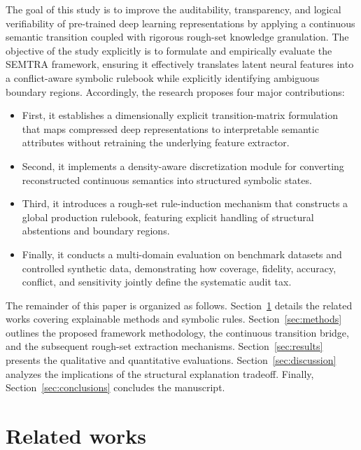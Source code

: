 \documentclass[make,article,submit,pdftex,moreauthors]{Definitions/mdpi}
\begin{document}
The goal of this study is to improve the auditability, transparency, and logical verifiability of pre-trained deep learning representations by applying a continuous semantic transition coupled with rigorous rough-set knowledge granulation. The objective of the study explicitly is to formulate and empirically evaluate the SEMTRA framework, ensuring it effectively translates latent neural features into a conflict-aware symbolic rulebook while explicitly identifying ambiguous boundary regions. Accordingly, the research proposes four major contributions:
\begin{itemize}
    \item First, it establishes a dimensionally explicit transition-matrix formulation that maps compressed deep representations to interpretable semantic attributes without retraining the underlying feature extractor.
    \item Second, it implements a density-aware discretization module for converting reconstructed continuous semantics into structured symbolic states.
    \item Third, it introduces a rough-set rule-induction mechanism that constructs a global production rulebook, featuring explicit handling of structural abstentions and boundary regions.
    \item Finally, it conducts a multi-domain evaluation on benchmark datasets and controlled synthetic data, demonstrating how coverage, fidelity, accuracy, conflict, and sensitivity jointly define the systematic audit tax.
\end{itemize}

The remainder of this paper is organized as follows. Section~\ref{sec:related} details the related works covering explainable methods and symbolic rules. Section~\ref{sec:methods} outlines the proposed framework methodology, the continuous transition bridge, and the subsequent rough-set extraction mechanisms. Section~\ref{sec:results} presents the qualitative and quantitative evaluations. Section~\ref{sec:discussion} analyzes the implications of the structural explanation tradeoff. Finally, Section~\ref{sec:conclusions} concludes the manuscript.

\section{Related works}
\label{sec:related}
\end{document}
